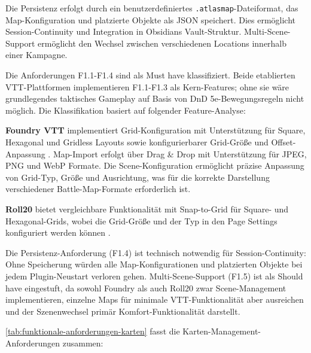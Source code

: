 Die Persistenz erfolgt durch ein benutzerdefiniertes \texttt{.atlasmap}-Dateiformat, das Map-Konfiguration und platzierte Objekte als \ac{JSON} speichert. Dies ermöglicht Session-Continuity und Integration in Obsidians Vault-Struktur. Multi-Scene-Support ermöglicht den Wechsel zwischen verschiedenen Locations innerhalb einer Kampagne.

Die Anforderungen F1.1-F1.4 sind als Must have klassifiziert. Beide etablierten \ac{VTT}-Plattformen implementieren F1.1-F1.3 als Kern-Features; ohne sie wäre grundlegendes taktisches Gameplay auf Basis von \ac{DnD} 5e-Bewegungsregeln nicht möglich. Die Klassifikation basiert auf folgender Feature-Analyse:

\textbf{Foundry \ac{VTT}} implementiert Grid-Konfiguration mit Unterstützung für Square, Hexagonal und Gridless Layouts sowie konfigurierbarer Grid-Größe und Offset-Anpassung \autocite{FoundryScenes2024}. Map-Import erfolgt über Drag \& Drop mit Unterstützung für \ac{JPEG}, \ac{PNG} und \ac{WebP} Formate. Die Scene-Konfiguration ermöglicht präzise Anpassung von Grid-Typ, Größe und Ausrichtung, was für die korrekte Darstellung verschiedener Battle-Map-Formate erforderlich ist.

\textbf{Roll20} bietet vergleichbare Funktionalität mit Snap-to-Grid für Square- und Hexagonal-Grids, wobei die Grid-Größe und der Typ in den Page Settings konfiguriert werden können \autocite{Roll20Graphics2024}.

Die Persistenz-Anforderung (F1.4) ist technisch notwendig für Session-Continuity: Ohne Speicherung würden alle Map-Konfigurationen und platzierten Objekte bei jedem Plugin-Neustart verloren gehen. Multi-Scene-Support (F1.5) ist als Should have eingestuft, da sowohl Foundry als auch Roll20 zwar Scene-Management implementieren, einzelne Maps für minimale \ac{VTT}-Funktionalität aber ausreichen und der Szenenwechsel primär Komfort-Funktionalität darstellt.

\autoref{tab:funktionale-anforderungen-karten} fasst die Karten-Management-Anforderungen zusammen:

